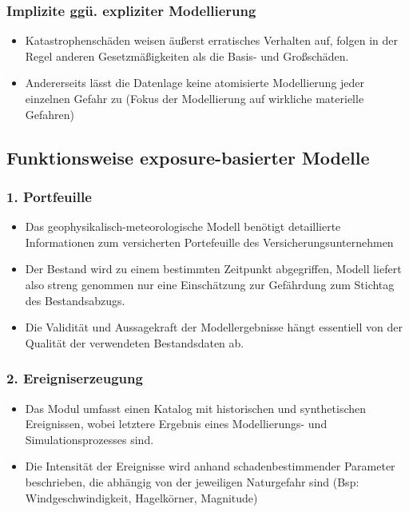 \documentclass[12pt]{report}
\theoremstyle{dotless}
\theoremstyle{definition}
\begin{document}
\subsubsection{Implizite ggü. expliziter Modellierung}
\begin{itemize}
\item Katastrophenschäden weisen äußerst erratisches Verhalten auf, folgen in der Regel anderen Gesetzmäßigkeiten als die Basis- und Großschäden.
\item Andererseits lässt die Datenlage keine atomisierte Modellierung jeder einzelnen Gefahr zu (Fokus der Modellierung auf wirkliche materielle Gefahren)
\end{itemize}

\subsection{Funktionsweise exposure-basierter Modelle}

\subsubsection{1. Portfeuille}
\begin{itemize}
\item Das geophysikalisch-meteorologische Modell benötigt detaillierte Informationen
zum versicherten Portefeuille des Versicherungsunternehmen
\item Der Bestand wird zu einem bestimmten Zeitpunkt abgegriffen, Modell liefert also
streng genommen nur eine Einschätzung zur Gefährdung zum Stichtag des
Bestandsabzugs.
\item Die Validität und Aussagekraft der Modellergebnisse hängt essentiell von der
Qualität der verwendeten Bestandsdaten ab.
\end{itemize}

\subsubsection{2. Ereigniserzeugung}
\begin{itemize}
\item Das Modul umfasst einen Katalog mit historischen und synthetischen Ereignissen,
wobei letztere Ergebnis eines Modellierungs- und Simulationsprozesses sind.
\item Die Intensität der Ereignisse wird anhand schadenbestimmender Parameter
beschrieben, die abhängig von der jeweiligen Naturgefahr sind (Bsp: Windgeschwindigkeit, Hagelkörner, Magnitude)
\end{itemize}
\end{document}
